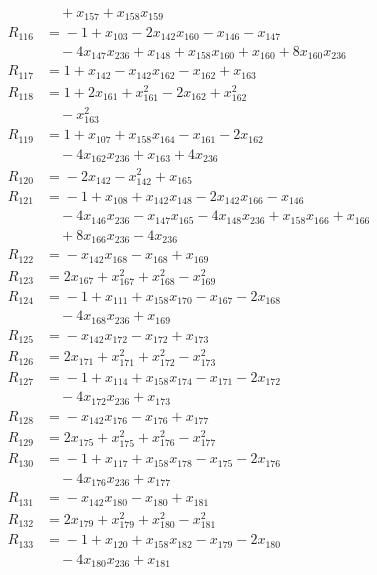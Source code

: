 \begin{align*}
&\quad{} +x_{157} +x_{158}x_{159} \\
R_{116} &={} -1 +x_{103} -2x_{142}x_{160} -x_{146} -x_{147} \\
&\quad{} -4x_{147}x_{236} +x_{148} +x_{158}x_{160} +x_{160} +8x_{160}x_{236} \\
R_{117} &={} 1 +x_{142} -x_{142}x_{162} -x_{162} +x_{163} \\
R_{118} &={} 1 +2x_{161} +x_{161}^{2} -2x_{162} +x_{162}^{2} \\
&\quad{} -x_{163}^{2} \\
R_{119} &={} 1 +x_{107} +x_{158}x_{164} -x_{161} -2x_{162} \\
&\quad{} -4x_{162}x_{236} +x_{163} +4x_{236} \\
R_{120} &={} -2x_{142} -x_{142}^{2} +x_{165} \\
R_{121} &={} -1 +x_{108} +x_{142}x_{148} -2x_{142}x_{166} -x_{146} \\
&\quad{} -4x_{146}x_{236} -x_{147}x_{165} -4x_{148}x_{236} +x_{158}x_{166} +x_{166} \\
&\quad{} +8x_{166}x_{236} -4x_{236} \\
R_{122} &={} -x_{142}x_{168} -x_{168} +x_{169} \\
R_{123} &={} 2x_{167} +x_{167}^{2} +x_{168}^{2} -x_{169}^{2} \\
R_{124} &={} -1 +x_{111} +x_{158}x_{170} -x_{167} -2x_{168} \\
&\quad{} -4x_{168}x_{236} +x_{169} \\
R_{125} &={} -x_{142}x_{172} -x_{172} +x_{173} \\
R_{126} &={} 2x_{171} +x_{171}^{2} +x_{172}^{2} -x_{173}^{2} \\
R_{127} &={} -1 +x_{114} +x_{158}x_{174} -x_{171} -2x_{172} \\
&\quad{} -4x_{172}x_{236} +x_{173} \\
R_{128} &={} -x_{142}x_{176} -x_{176} +x_{177} \\
R_{129} &={} 2x_{175} +x_{175}^{2} +x_{176}^{2} -x_{177}^{2} \\
R_{130} &={} -1 +x_{117} +x_{158}x_{178} -x_{175} -2x_{176} \\
&\quad{} -4x_{176}x_{236} +x_{177} \\
R_{131} &={} -x_{142}x_{180} -x_{180} +x_{181} \\
R_{132} &={} 2x_{179} +x_{179}^{2} +x_{180}^{2} -x_{181}^{2} \\
R_{133} &={} -1 +x_{120} +x_{158}x_{182} -x_{179} -2x_{180} \\
&\quad{} -4x_{180}x_{236} +x_{181} \\

\end{align*}
